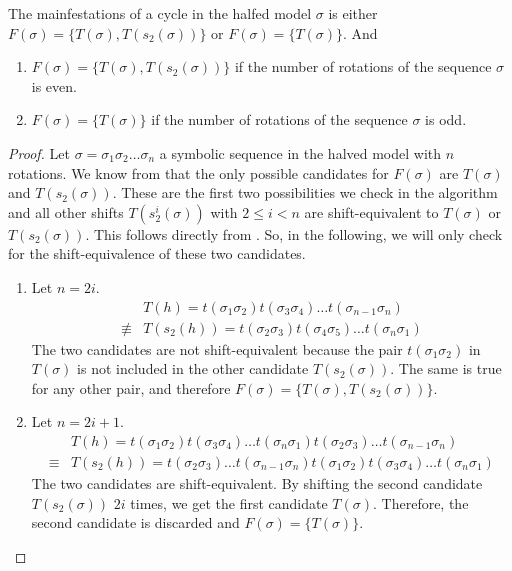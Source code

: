 \begin{theorem}
    \label{theorem:coexistence.even}
    The mainfestations of a cycle in the halfed model $\sigma$ is either $F(\sigma) = \{T(\sigma), T(s_2(\sigma))\}$ or $F(\sigma) = \{T(\sigma)\}$.
    And \begin{enumerate}
        \item $F(\sigma) = \{T(\sigma), T(s_2(\sigma))\}$ if the number of rotations of the sequence $\sigma$ is even.
        \item $F(\sigma) = \{T(\sigma)\}$ if the number of rotations of the sequence $\sigma$ is odd.
    \end{enumerate}
\end{theorem}

\begin{proof}
    Let $\sigma = \sigma_1\sigma_2 \dots \sigma_n$ a symbolic sequence in the halved model with $n$ rotations.
    We know from  that the only possible candidates for $F(\sigma)$ are $T(\sigma)$ and $T(s_2(\sigma))$.
    These are the first two possibilities we check in the algorithm and all other shifts $T(s_2^i(\sigma))$ with $2 \leq i < n$ are shift-equivalent to $T(\sigma)$ or $T(s_2(\sigma))$.
    This follows directly from .
    So, in the following, we will only check for the shift-equivalence of these two candidates.
    \begin{enumerate}
        \item Let $n = 2i$.
              \begin{align*}
                          & T(h) = t(\sigma_1\sigma_2) t(\sigma_3\sigma_4) \dots t(\sigma_{n-1}\sigma_n) \\
                  \nequiv & T(s_2(h)) = t(\sigma_2\sigma_3) t(\sigma_4\sigma_5) \dots t(\sigma_n\sigma_1)
              \end{align*}
              The two candidates are not shift-equivalent because the pair $t(\sigma_1\sigma_2)$ in $T(\sigma)$ is not included in the other candidate $T(s_2(\sigma))$.
              The same is true for any other pair, and therefore $F(\sigma) = \{T(\sigma), T(s_2(\sigma))\}$.
        \item Let $n = 2i + 1$.
              \begin{align*}
                         & T(h) = t(\sigma_1\sigma_2) t(\sigma_3\sigma_4) \dots t(\sigma_n\sigma_1) t(\sigma_2\sigma_3) \dots t(\sigma_{n-1}\sigma_n) \\
                  \equiv & T(s_2(h)) = t(\sigma_2\sigma_3) \dots t(\sigma_{n-1}\sigma_n) t(\sigma_1\sigma_2) t(\sigma_3\sigma_4) \dots t(\sigma_n\sigma_1)
              \end{align*}
              The two candidates are shift-equivalent.
              By shifting the second candidate $T(s_2(\sigma))$ $2i$ times, we get the first candidate $T(\sigma)$.
              Therefore, the second candidate is discarded and $F(\sigma) = \{T(\sigma)\}$.
    \end{enumerate}
\end{proof}

